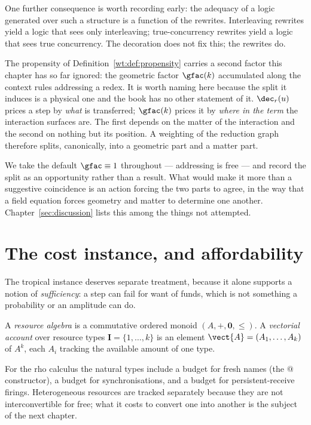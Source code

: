 One further consequence is worth recording early:
the adequacy of a logic generated over such a structure is a function of
the rewrites.  Interleaving rewrites yield a logic that sees only
interleaving; true-concurrency rewrites yield a logic that sees true
concurrency.  The decoration does not fix this; the rewrites do.

\begin{remark}
\label{rmk:geomatter}
The propensity of Definition~\ref{wt:def:propensity} carries a second
factor this chapter has so far ignored: the geometric factor
$\gfac(k)$ accumulated along the context rules addressing a redex.  It is
worth naming here because the split it induces is a physical one and the
book has no other statement of it.  $\dec_r(u)$ prices a step by
\emph{what} is transferred; $\gfac(k)$ prices it by \emph{where in the
term} the interaction surfaces are.  The first depends on the matter of
the interaction and the second on nothing but its position.  A weighting
of the reduction graph therefore splits, canonically, into a geometric
part and a matter part.

We take the default $\gfac \equiv 1$ throughout --- addressing is free ---
and record the split as an opportunity rather than a result.  What would
make it more than a suggestive coincidence is an action forcing the two
parts to agree, in the way that a field equation forces geometry and
matter to determine one another.  Chapter~\ref{sec:discussion} lists
this among the things not attempted.
\end{remark}

\section{The cost instance, and affordability}

The tropical instance deserves separate treatment, because it alone
supports a notion of \emph{sufficiency}: a step can fail for want of
funds, which is not something a probability or an amplitude can do.

\begin{definition}
A \emph{resource algebra} is a commutative ordered monoid
$(A, +, \mathbf{0}, \leq)$.  A \emph{vectorial account} over resource
types $\mathbf{I} = \{1,\ldots,k\}$ is an element
$\vect{A} = (A_1,\ldots,A_k)$ of $A^k$, each $A_i$ tracking the available
amount of one type.
\end{definition}

For the rho calculus the natural types include a budget for fresh names
(the $@$ constructor), a budget for synchronisations, and a budget for
persistent-receive firings.  Heterogeneous resources are tracked
separately because they are not interconvertible for free; what it costs
to convert one into another is the subject of the next chapter.

